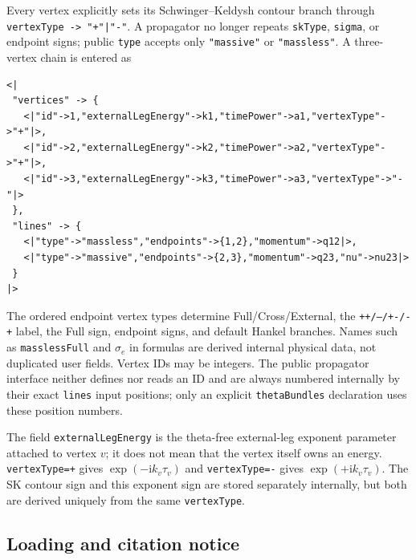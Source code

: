 \documentclass[11pt,a4paper]{article}
\newcommand{\ii}{\mathrm i}
\begin{document}
Every vertex explicitly sets its Schwinger--Keldysh contour branch through
\texttt{vertexType -> "+"|"-"}. A propagator no longer repeats \texttt{skType},
\texttt{sigma}, or endpoint signs; public \texttt{type} accepts only \texttt{"massive"}
or \texttt{"massless"}. A three-vertex chain is entered as
\begin{verbatim}
<|
 "vertices" -> {
   <|"id"->1,"externalLegEnergy"->k1,"timePower"->a1,"vertexType"->"+"|>,
   <|"id"->2,"externalLegEnergy"->k2,"timePower"->a2,"vertexType"->"+"|>,
   <|"id"->3,"externalLegEnergy"->k3,"timePower"->a3,"vertexType"->"-"|>
 },
 "lines" -> {
   <|"type"->"massless","endpoints"->{1,2},"momentum"->q12|>,
   <|"type"->"massive","endpoints"->{2,3},"momentum"->q23,"nu"->nu23|>
 }
|>
\end{verbatim}
The ordered endpoint vertex types determine Full/Cross/External, the
\texttt{++/--/+-/-+} label, the Full sign, endpoint signs, and default Hankel branches.
Names such as \texttt{masslessFull} and $\sigma_e$ in formulas are derived internal physical
data, not duplicated user fields. Vertex IDs may be integers. The public propagator interface neither defines nor reads an ID and
are always numbered internally by their exact \texttt{lines} input positions; only an explicit
\texttt{thetaBundles} declaration uses these position numbers.

The field \texttt{externalLegEnergy} is the theta-free external-leg exponent parameter
attached to vertex $v$; it does not mean that the vertex itself owns an energy.
\texttt{vertexType=+} gives $\exp(-\ii k_v\tau_v)$ and \texttt{vertexType=-} gives
$\exp(+\ii k_v\tau_v)$. The SK contour sign and this exponent sign are stored separately
internally, but both are derived uniquely from the same \texttt{vertexType}.

\subsection{Loading and citation notice}
\end{document}
